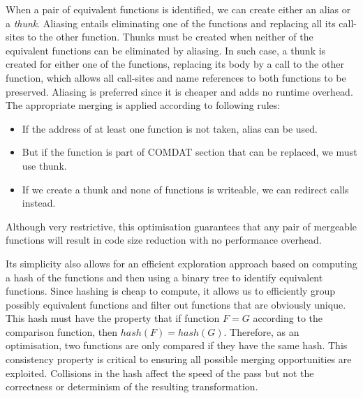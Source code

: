 When a pair of equivalent functions is identified, we can create either
an alias or a \textit{thunk}.
Aliasing entails eliminating one of the functions and replacing all its call-sites
to the other function.
Thunks must be created when neither of the equivalent functions can be eliminated
by aliasing.
In such case, a thunk is created for either one of the functions, replacing its
body by a call to the other function, which allows all call-sites and name
references to both functions to be preserved.
Aliasing is preferred since it is cheaper and adds no runtime overhead.
The appropriate merging is applied according to following rules:
\begin{itemize}
\item If the address of at least one function is not taken, alias can be used.
\item But if the function is part of COMDAT section that can be replaced, we
must use thunk.
\item If we create a thunk and none of functions is writeable, we can redirect calls
instead.
\end{itemize}
Although very restrictive, this optimisation guarantees that any pair of
mergeable functions will result in code size reduction with no performance
overhead.

Its simplicity also allows for an efficient exploration approach based on computing
a hash of the functions and then using a binary tree to identify equivalent
functions.
Since hashing is cheap to compute, it allows us to efficiently
group possibly equivalent functions and filter out functions
that are obviously unique.
This hash must have the property that if function $F = G$
according to the comparison function, then $hash(F) = hash(G)$.
Therefore, as an optimisation, two functions are only compared if they have the
same hash.
This consistency property is critical to ensuring all possible merging
opportunities are exploited.
Collisions in the hash affect the speed of the pass but not the correctness
or determinism of the resulting transformation.

